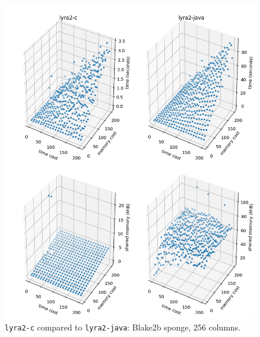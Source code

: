 \begin{figure}[H]
    \centering
    \includegraphics[width=\linewidth]{figures/tcost_mcost_blake2b_256}
    \caption{\texttt{lyra2-c} compared to \texttt{lyra2-java}: Blake2b sponge, 256 columns.}
    \label{figure:tcost_mcost_blake2b_256}
\end{figure}

